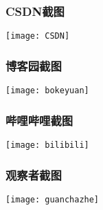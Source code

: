 \documentclass{article}
\begin{document}
\subsubsection{CSDN截图}
\begin{center}
	\texttt{[image: CSDN]}
\end{center}
\subsubsection{博客园截图}
\begin{center}
	\texttt{[image: bokeyuan]}
\end{center}
\subsubsection{哔哩哔哩截图}
\begin{center}
	\texttt{[image: bilibili]}
\end{center}
\subsubsection{观察者截图}
\begin{center}
	\texttt{[image: guanchazhe]}
\end{center}
\hspace*{\fill} \\


\end{document}

